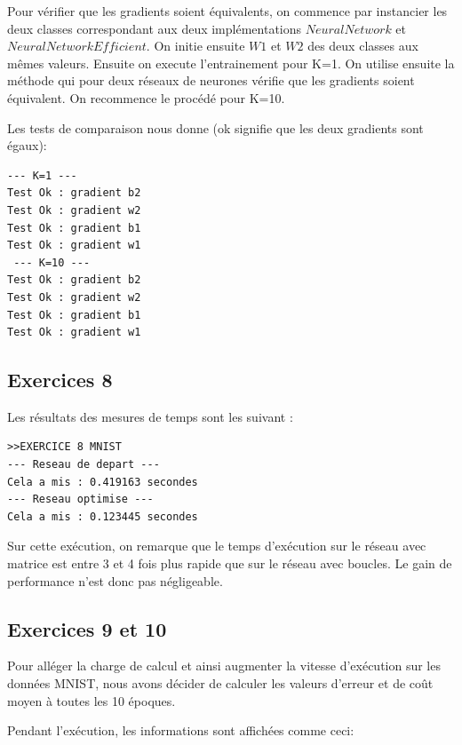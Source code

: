 \documentclass[a4paper,11pt]{article}
\begin{document}
Pour vérifier que les gradients soient équivalents, on commence par instancier les deux classes correspondant aux deux implémentations $NeuralNetwork$ et $NeuralNetworkEfficient$. On initie ensuite $W1$ et $W2$ des deux classes aux mêmes valeurs. Ensuite on execute l'entrainement pour K=1. On utilise ensuite la méthode qui pour deux réseaux de neurones vérifie que les gradients soient équivalent. On recommence le procédé pour K=10.

Les tests de comparaison nous donne (ok signifie que les deux gradients sont égaux):

\begin{verbatim}
--- K=1 ---
Test Ok : gradient b2
Test Ok : gradient w2
Test Ok : gradient b1
Test Ok : gradient w1
 --- K=10 ---
Test Ok : gradient b2
Test Ok : gradient w2
Test Ok : gradient b1
Test Ok : gradient w1
\end{verbatim}


\subsection{Exercices 8}

Les résultats des mesures de temps sont les suivant : 

\begin{verbatim}
>>EXERCICE 8 MNIST
--- Reseau de depart ---
Cela a mis : 0.419163 secondes
--- Reseau optimise ---
Cela a mis : 0.123445 secondes
\end{verbatim}

Sur cette exécution, on remarque que le temps d'exécution sur le réseau avec matrice est entre 3 et 4 fois plus rapide que sur le réseau avec boucles. Le gain de performance n'est donc pas négligeable.

\subsection{Exercices 9 et 10}

Pour alléger la charge de calcul et ainsi augmenter la vitesse d'exécution sur les données MNIST, nous avons décider de calculer les valeurs d'erreur et de coût moyen à toutes les 10 époques.

Pendant l'exécution, les informations sont affichées comme ceci:
\end{document}
